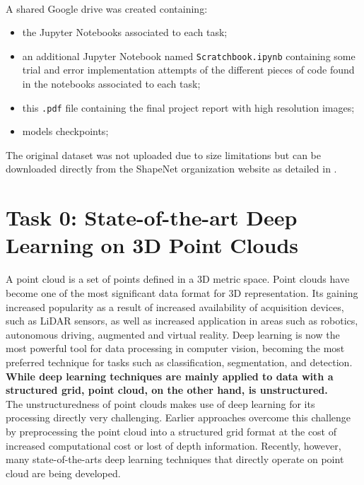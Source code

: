 \documentclass[11pt,a4paper]{article}
\begin{document}
\\
A shared Google drive was created containing:
\begin{itemize}
    \item the Jupyter Notebooks associated to each task;
    \item an additional Jupyter Notebook named \texttt{Scratchbook.ipynb} containing some trial and error implementation attempts of the different pieces of code found in the notebooks associated to each task;
    \item this \texttt{.pdf} file containing the final project report with high resolution images;
    \item models checkpoints;
\end{itemize}
The original dataset was not uploaded due to size limitations but can be downloaded directly from the ShapeNet organization website as detailed in .

\newpage
\section{Task 0: State-of-the-art Deep Learning on 3D Point Clouds}
A point cloud is a set of points defined in a 3D metric space. Point clouds have become one of the most significant data format for 3D representation. Its gaining increased popularity as a result of increased availability of acquisition devices, such as LiDAR sensors, as well as increased application in areas such as robotics, autonomous driving, augmented and virtual reality. Deep learning is now the most powerful tool for data processing in computer vision, becoming the most preferred technique for tasks such as classification, segmentation, and detection. \textbf{While deep learning techniques are mainly applied to data with a structured grid, point cloud, on the other hand, is unstructured.}\\
The unstructuredness of point clouds makes use of deep learning for its processing directly very challenging. Earlier approaches overcome this challenge by preprocessing the point cloud into a structured grid format at the cost of increased computational cost or lost of depth information. Recently, however, many state-of-the-arts deep learning techniques that directly operate on point cloud are being developed. \cite{9127813}
\end{document}
